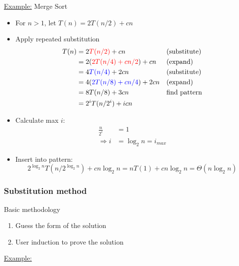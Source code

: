\underline{Example:} Merge Sort
\begin{itemize}
    \item For $n>1$, let $T(n)=2T(n/2)+cn$
    \item Apply repeated substitution
    \begin{align*}
        T(n) &= 2\textcolor{red}{T(n/2)} + cn && \text{(substitute)} \\   
        &= 2(\textcolor{red}{2T(n/4)+cn/2})+cn &&\text{(expand)}\\
        &= 4\textcolor{blue}{T(n/4)} + 2cn &&\text{(substitute)} \\
        &= 4(\textcolor{blue}{2T(n/8)+cn/4})+2cn &&\text{(expand)}\\
        &= 8T(n/8)+3cn &&\text{{find pattern}} \\
        &= 2^iT(n/2^{i})+icn
    \end{align*}
    \item Calculate max $i$:
    \begin{align*}
        \frac{n}{2^{i}} &= 1\\
        \Rightarrow i &= \log_2 n = i_{max}
    \end{align*}
    \item Insert into pattern:\[
    2^{\log_2 n} T(n/2^{\log_2 n}) + cn \log_2 n= nT(1)+cn \log_2 n = \boxed{\Theta(n \log_2 n)}
    \]
\end{itemize}

\subsubsection{Substitution method}
Basic methodology
\begin{enumerate}
    \item Guess the form of the solution 
    \item User induction to prove the solution
\end{enumerate}

\underline{Example:} \\

